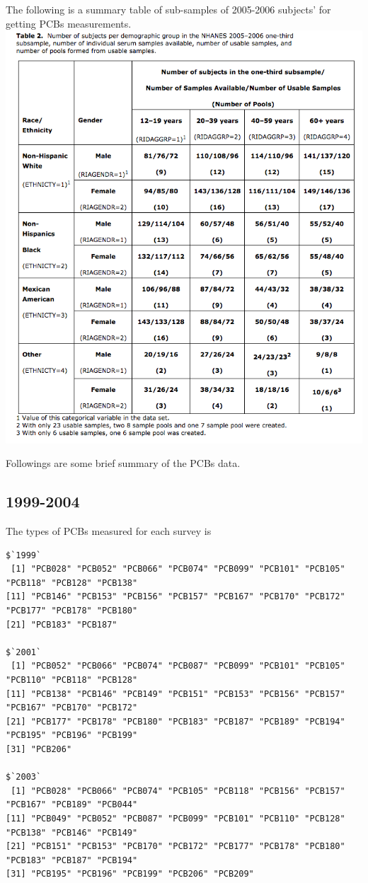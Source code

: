 \documentclass[]{article}
\begin{document}
The following is a summary table of sub-samples of 2005-2006 subjects'
for getting PCBs measurements.
\includegraphics{./figs/subsampling_2005.png}

\newpage

Followings are some brief summary of the PCBs data.

\subsection{1999-2004}\label{section}

The types of PCBs measured for each survey is

\begin{verbatim}
$`1999`
 [1] "PCB028" "PCB052" "PCB066" "PCB074" "PCB099" "PCB101" "PCB105" "PCB118" "PCB128" "PCB138"
[11] "PCB146" "PCB153" "PCB156" "PCB157" "PCB167" "PCB170" "PCB172" "PCB177" "PCB178" "PCB180"
[21] "PCB183" "PCB187"

$`2001`
 [1] "PCB052" "PCB066" "PCB074" "PCB087" "PCB099" "PCB101" "PCB105" "PCB110" "PCB118" "PCB128"
[11] "PCB138" "PCB146" "PCB149" "PCB151" "PCB153" "PCB156" "PCB157" "PCB167" "PCB170" "PCB172"
[21] "PCB177" "PCB178" "PCB180" "PCB183" "PCB187" "PCB189" "PCB194" "PCB195" "PCB196" "PCB199"
[31] "PCB206"

$`2003`
 [1] "PCB028" "PCB066" "PCB074" "PCB105" "PCB118" "PCB156" "PCB157" "PCB167" "PCB189" "PCB044"
[11] "PCB049" "PCB052" "PCB087" "PCB099" "PCB101" "PCB110" "PCB128" "PCB138" "PCB146" "PCB149"
[21] "PCB151" "PCB153" "PCB170" "PCB172" "PCB177" "PCB178" "PCB180" "PCB183" "PCB187" "PCB194"
[31] "PCB195" "PCB196" "PCB199" "PCB206" "PCB209"
\end{verbatim}
\end{document}
